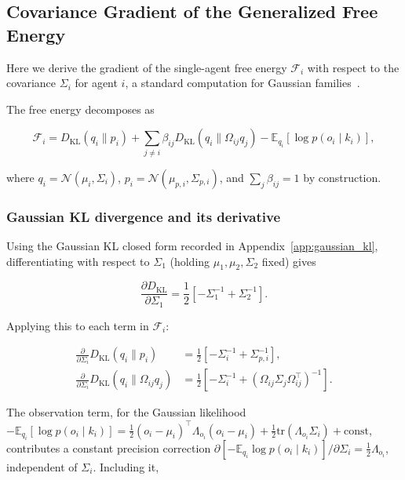 \documentclass[11pt]{article}
\begin{document}
\subsection{Covariance Gradient of the Generalized Free Energy}

Here we derive the gradient of the single-agent free energy $\mathcal{F}_i$ with respect to the covariance $\Sigma_i$ for agent $i$, a standard computation for Gaussian families~\cite{Amari2016, petersen2012matrix}.

The free energy decomposes as

\begin{equation}
\mathcal{F}_i
=D_{\mathrm{KL}}(q_i \| p_i)
+ \sum_{j \neq i} \beta_{ij}
D_{\mathrm{KL}}(q_i \| \Omega_{ij} q_j)
- \mathbb{E}_{q_i}[\log p(o_i \mid k_i)],
\end{equation}

where $q_i = \mathcal{N}(\mu_i, \Sigma_i)$, $p_i = \mathcal{N}(\mu_{p,i}, \Sigma_{p,i})$, and $\sum_j \beta_{ij} = 1$ by construction.

\subsubsection{Gaussian KL divergence and its derivative}

Using the Gaussian KL closed form recorded in Appendix~\ref{app:gaussian_kl}, differentiating with respect to $\Sigma_1$ (holding $\mu_1, \mu_2, \Sigma_2$ fixed) gives

\begin{equation}
\frac{\partial D_{\mathrm{KL}}}{\partial \Sigma_1}
=\frac{1}{2}\left[
-\Sigma_1^{-1}
+ \Sigma_2^{-1}
\right].
\end{equation}

Applying this to each term in $\mathcal{F}_i$:

\begin{align}
\frac{\partial}{\partial \Sigma_i}
D_{\mathrm{KL}}(q_i \| p_i)
&=\frac{1}{2}\left[
-\Sigma_i^{-1}
+ \Sigma_{p,i}^{-1}
\right],
\\[6pt]
\frac{\partial}{\partial \Sigma_i}
D_{\mathrm{KL}}(q_i \| \Omega_{ij} q_j)
&=
\frac{1}{2}\left[
-\Sigma_i^{-1}
+ (\Omega_{ij}\Sigma_j\Omega_{ij}^\top)^{-1}
\right].
\end{align}

The observation term, for the Gaussian likelihood $-\mathbb{E}_{q_i}[\log p(o_i \mid k_i)] = \tfrac{1}{2}(o_i - \mu_i)^\top \Lambda_{o_i}(o_i - \mu_i) + \tfrac{1}{2}\mathrm{tr}(\Lambda_{o_i}\Sigma_i) + \mathrm{const}$, contributes a constant precision correction $\partial[-\mathbb{E}_{q_i}\log p(o_i \mid k_i)]/\partial\Sigma_i = \tfrac{1}{2}\Lambda_{o_i}$, independent of $\Sigma_i$. Including it,
\end{document}
